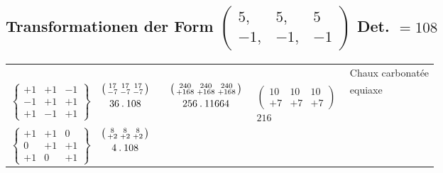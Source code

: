 \subsection*{Transformationen der Form $\left(\begin{smallmatrix}5,&5,&5\\-1,&-1,&-1\end{smallmatrix}\right)$ Det. $=108$}
\begin{center}\scriptsize
\setlength{\tabcolsep}{2pt}
\begin{tabular}{ccccc l}
&&&&&Chaux carbonatée\\
$\left\{\begin{smallmatrix}+1&+1&-1\\-1&+1&+1\\+1&-1&+1\end{smallmatrix}\right\}$&
$\begin{gathered}\left(\begin{smallmatrix}17&17&17\\-7&-7&-7\end{smallmatrix}\right)\\36\mathbin{.}108\end{gathered}$&&
$\begin{gathered}\left(\begin{smallmatrix}240&240&240\\+168&+168&+168\end{smallmatrix}\right)\\256\mathbin{.}11664\end{gathered}$&
$\begin{gathered}\left(\begin{smallmatrix}10&10&10\\+7&+7&+7\end{smallmatrix}\right)\\216\end{gathered}$&equiaxe\\[1.4ex]
$\left\{\begin{smallmatrix}+1&+1&0\\0&+1&+1\\+1&0&+1\end{smallmatrix}\right\}$&
$\begin{gathered}\left(\begin{smallmatrix}8&8&8\\+2&+2&+2\end{smallmatrix}\right)\\4\mathbin{.}108\end{gathered}$&

\end{tabular}
\end{center}
